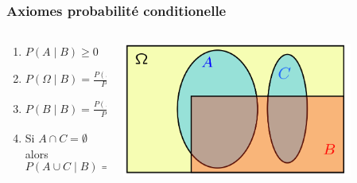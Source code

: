 \documentclass{beamer}
\begin{document}
\begin{frame}[t]
    \frametitle{Axiomes probabilité conditionelle}
    
    \begin{columns}
        \begin{column}{0.5\textwidth}
           \begin{enumerate}
               \small
               \item<1->  $P(A\;|\;B) \geq 0$\\[8pt]
               \item<2-> $P(\Omega\;|\;B) = \frac{P\left(\Omega \cap
                   B\right)}{P(B)} = 1$\\[8pt]
               \item<3-> $P(B\;|\;B) = \frac{P\left(B \cap B\right)}{P(B)} =
                   1$\\[8pt]
               \item<4-> Si $A\cap C = \emptyset$ alors 
                   $$
                   P( A \cup C\;|\; B) = P(A\;|\; B) + P(A\;|\; B)
                   $$

            
           \end{enumerate} 
        \end{column}
        \begin{column}{0.5\textwidth}
           {
    \centering
    \includegraphics[width=0.8\textwidth]{./cond_axioms.png}
           }
        \end{column}
    \end{columns}
\end{frame}
\end{document}
